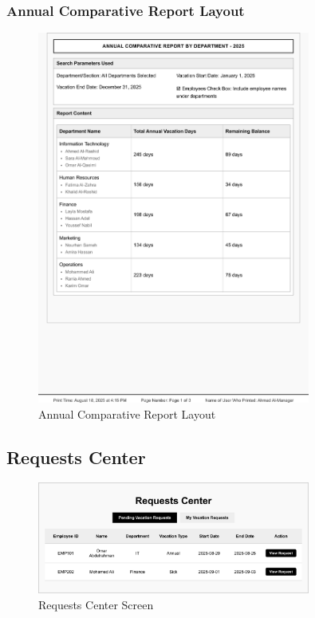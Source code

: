 \documentclass[12pt,a4paper]{article}
\begin{document}
\subsubsection{Annual Comparative Report Layout}
\begin{figure}[H]
\centering
\includegraphics[width=0.8\textwidth]{Wireframes/Print-Layout-Annual-Comparative-Report/Print-Layout-Annual-Comparative-Report-Web-1.png}
\caption{Annual Comparative Report Layout}
\label{fig:annual-comparative-report-layout}
\end{figure}

\subsection{Requests Center}
\begin{figure}[H]
\centering
\includegraphics[width=0.8\textwidth]{Wireframes/Requests-Center/Requests-Center-1.png}
\caption{Requests Center Screen}
\label{fig:requests-center-screen}
\end{figure}
\end{document}
